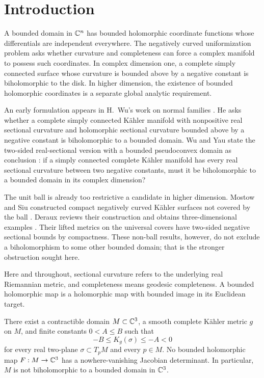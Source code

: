 \section{Introduction}
\label{sec:introduction}

A bounded domain in $\mathbb C^n$ has bounded holomorphic coordinate functions
whose differentials are independent everywhere. The negatively curved
uniformization problem asks whether curvature and completeness can
force a complex manifold to possess such coordinates. In complex
dimension one, a complete simply connected surface whose curvature is
bounded above by a negative constant is biholomorphic to the disk. In higher
dimension, the existence of bounded holomorphic coordinates is a
separate global analytic requirement.

An early formulation appears in H.~Wu's work on normal families
\cite[p.~195, question~(1)]{WuNormal1967}. He asks whether a complete
simply connected K\"ahler manifold with nonpositive real sectional
curvature and holomorphic sectional curvature bounded above by a
negative constant is biholomorphic to a bounded domain. Wu and Yau
state the two-sided real-sectional version with a bounded pseudoconvex
domain as conclusion \cite[Conjecture~4.3, p.~18]{WuYauSurvey2019}:
if a simply connected complete K\"ahler manifold has every real
sectional curvature between two negative constants, must it be
biholomorphic to a bounded domain in its complex dimension?

The unit ball is already too restrictive a candidate in higher
dimension. Mostow and Siu constructed compact negatively curved
K\"ahler surfaces not covered by the ball \cite{MostowSiu1980}.
Deraux reviews their construction and obtains three-dimensional
examples \cite{Deraux2005}.
Their lifted metrics on the universal covers have two-sided negative
sectional bounds by compactness. These non-ball results, however, do
not exclude a biholomorphism to some other bounded domain; that is
the stronger obstruction sought here.

Here and throughout, sectional curvature refers to the underlying real
Riemannian metric, and completeness means geodesic completeness. A
bounded holomorphic map is a holomorphic map with bounded image in its
Euclidean target.

\begin{theorem}\label{main:theorem}
There exist a contractible domain $M\subset\mathbb C^3$, a smooth complete
K\"ahler metric $g$ on $M$, and finite constants $0<A\le B$ such that
\[
 -B\le K_g(\sigma)\le -A<0
\]
for every real two-plane $\sigma\subset T_pM$ and every $p\in M$.
No bounded holomorphic map $F:M\to\mathbb C^3$ has a nowhere-vanishing Jacobian
determinant. In particular, $M$ is not biholomorphic to a bounded domain
in $\mathbb C^3$.
\end{theorem}

